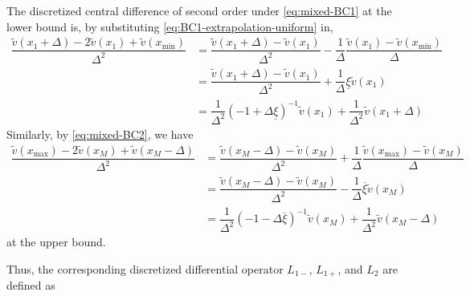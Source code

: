 \documentclass[11pt]{article}
\theoremstyle{definition}
\begin{document}
The discretized central difference of second order under \eqref{eq:mixed-BC1} at the lower bound is, by substituting \eqref{eq:BC1-extrapolation-uniform} in,
\begin{align}
\dfrac{\tilde{v}({x_{1}} + \Delta) - 2 \tilde{v}({x_{1}}) + \tilde{v}(x_{\min})}{\Delta^2} &=   \dfrac{\tilde{v}({x_{1}} + \Delta) - \tilde{v}({x_{1}})}{\Delta^2} - \dfrac{1}{\Delta}\dfrac{\tilde{v}({x_{1}}) - \tilde{v}(x_{\min}) }{\Delta}  \\
&= \dfrac{\tilde{v}({x_{1}} + \Delta) - \tilde{v}({x_{1}})}{\Delta^2} + \dfrac{1}{\Delta} \underline{\xi} \tilde{v}({x_{1}})  \\
&= \dfrac{1}{\Delta^2}  (- 1 + \Delta \underline{\xi})^{-1} \tilde{v}({x_{1}})  + \dfrac{1}{\Delta^2}  \tilde{v}({x_{1}} + \Delta)
\end{align}
Similarly, by \eqref{eq:mixed-BC2}, we have
\begin{align}
\dfrac{\tilde{v}(x_{\max}) - 2 \tilde{v}({x_{M}} ) + \tilde{v}({x_{M}} -\Delta)}{\Delta^2} &=   \dfrac{\tilde{v}({x_{M}} - \Delta) - \tilde{v}({x_{M}})}{\Delta^2} + \dfrac{1}{\Delta}\dfrac{ \tilde{v}(x_{\max}) - \tilde{v}({x_{M}}) }{\Delta}  \\
&= \dfrac{\tilde{v}({x_{M}} - \Delta) - \tilde{v}({x_{M}})}{\Delta^2}  - \dfrac{1}{\Delta} \overline{\xi} \tilde{v}({x_{M}})  \\
&= \dfrac{1}{\Delta^2}  (- 1 - \Delta \overline{\xi})^{-1} \tilde{v}({x_{M}})  + \dfrac{1}{\Delta^2}  \tilde{v}({x_{M}} - \Delta)
\end{align}
at the upper bound.

Thus, the corresponding discretized differential operator $L_{1-}$, $L_{1+}$, and $L_2$ are defined as
\end{document}
